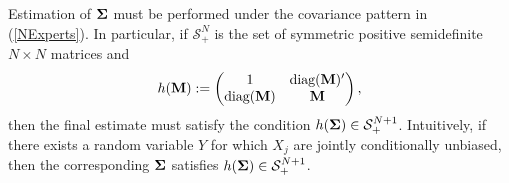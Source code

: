 \documentclass[11pt]{article}
\newcommand{\COR}{\text{COR}}
\theoremstyle{definition}
\theoremstyle{definition}
\def\bSigma{{\bf \Sigma}}
\def\M{{\bf M}}
\def\conv{\text{conv}}
\def\diag{\text{diag}}
\def\Diag{\text{Diag}}
\def\diag{\text{diag}}
\begin{document}
Estimation of $\bSigma$ must be performed under the covariance pattern in (\ref{NExperts}). In particular, if $\mathcal{S}_{+}^N$ is the set of  symmetric positive semidefinite $N \times N$ matrices and 
\begin{align*}
h(\M)  := 
\left(\begin{matrix} 
1 & \diag(\M)' \\
\diag(\M) &\M\\
 \end{matrix}\right),
\end{align*}
then the final estimate must satisfy the condition $h(\bSigma) \in \mathcal{S}_{+}^{N+1}$. Intuitively, 
if there exists a random variable $Y$ for which $X_j$ are jointly conditionally unbiased, then the corresponding $\bSigma$ satisfies $h(\bSigma) \in \mathcal{S}_{+}^{N+1}$. 
\end{document}
